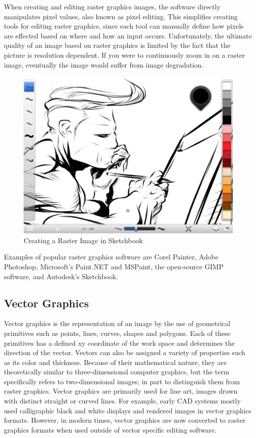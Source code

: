 \documentclass[11pt]{report}
\begin{document}
When creating and editing raster graphics images, the software directly manipulates pixel values, also known as pixel editing.
This simplifies creating tools for editing raster graphics, since each tool can manually define how pixels are effected based on where and how an input occurs. 
Unfortunately, the ultimate quality of an image based on raster graphics is limited by the fact that the picture is resolution dependent. 
If you were to continuously zoom in on a raster image, eventually the image would suffer from image degradation. 

\begin{figure}
\includegraphics[width=\textwidth]{sketchbook.jpg}
\caption{Creating a Raster Image in Sketchbook}
\end{figure}



Examples of popular raster graphics software are Corel Painter, Adobe Photoshop, Microsoft's Paint.NET and MSPaint, the open-source GIMP software, and Autodesk's Sketchbook.

\subsection{Vector Graphics}

Vector graphics is the representation of an image by the use of geometrical primitives such as points, lines, curves, shapes and polygons.
Each of these primitives has a defined xy coordinate of the work space and determines the direction of the vector. 
Vectors can also be assigned a variety of properties such as its color and thickness.
Because of their mathematical nature, they are theoretically similar to three-dimensional computer graphics, but the term specifically refers to two-dimensional images; in part to distinguish them from raster graphics.
Vector graphics are primarily used for line art, images drawn with distinct straight or curved lines.
For example, early CAD systems mostly used calligraphic black and white displays and rendered images in vector graphics formats. However, in modern times, vector graphics are now converted to raster graphics formats when used outside of vector specific editing software.  
\end{document}

